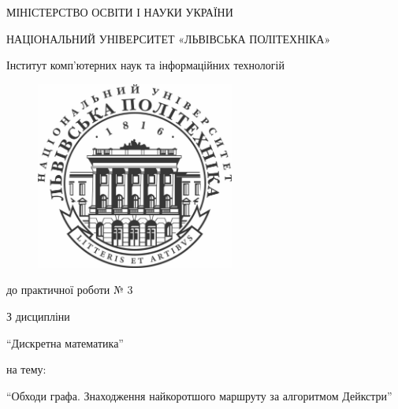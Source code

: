 \documentclass{article}
\begin{document}
\pagestyle{empty}
\begin{center}

	{\fontsize{14}{24}\selectfont МІНІСТЕРСТВО ОСВІТИ І НАУКИ УКРАЇНИ

	НАЦІОНАЛЬНИЙ УНІВЕРСИТЕТ «ЛЬВІВСЬКА ПОЛІТЕХНІКА»

	Інститут комп'ютерних наук та інформаційних технологій

	}

	\vspace{90.4pt} %
	\begin{figure}[h]
		\centering
		\includegraphics[width=6.5cm,keepaspectratio]{../../../lpnu.png}
	\end{figure}

	{\fontsize{18}{29}\selectfont{Звіт}

	{до практичної роботи № 3}

	{З дисципліни}

	{``Дискретна математика''}

	{на тему:}

	{``Обходи графа. Знаходження найкоротшого маршруту за
алгоритмом Дейкстри''}

	}
\end{center}
\end{document}

